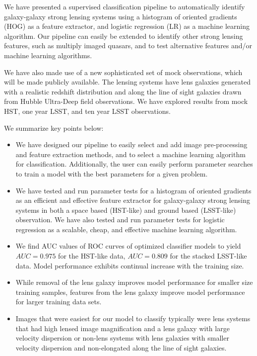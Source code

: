 \documentclass{emulateapj}
\begin{document}
We have presented a supervised classification pipeline to
automatically identify galaxy-galaxy strong lensing systems using a
histogram of oriented gradients (HOG) as a feature extractor, and
logistic regression (LR) as a machine learning algorithm.  Our
pipeline can easily be extended to identify other strong lensing
features, such as multiply imaged quasars, and to test alternative
features and/or machine learning algorithms.


We have also made use of a new sophisticated set of mock observations,
which will be made publicly available.  The lensing systems have
lens galaxies generated with a realistic redshift distribution and
along the line of sight galaxies drawn from Hubble Ultra-Deep field
observations.  We have explored results from mock HST, one year LSST,
and ten year LSST observations.


We summarize key points below:

\begin{itemize}

\item We have designed our pipeline to easily select and add image
  pre-processing and feature extraction methods, and to select a
  machine learning algorithm for classification.  Additionally, the
  user can easily perform parameter searches to train a model with the
  best parameters for a given problem.

\item We have tested and run parameter tests for a histogram of
  oriented gradients as an efficient and effective feature extractor
  for galaxy-galaxy strong lensing systems in both a space based
  (HST-like) and ground based (LSST-like) observation.  We have also
  tested and run parameter tests for logistic regression as a
  scalable, cheap, and effective machine learning algorithm.

\item We find AUC values of ROC curves of optimized classifier models
  to yield $AUC=0.975$ for the HST-like data, $AUC=0.809$ for the
  stacked LSST-like data.  Model performance exhibits continual
  increase with the training size.

\item While removal of the lens galaxy improves model performance for
  smaller size training samples, features from the lens galaxy improve
  model performance for larger training data sets.

\item Images that were easiest for our model to classify typically
  were lens systems that had high lensed image magnification and a
  lens galaxy with large velocity dispersion or non-lens systems with
  lens galaxies with smaller velocity dispersion and non-elongated
  along the line of sight galaxies.
\end{itemize}
\end{document}
